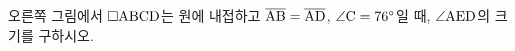 \noindent\begin{minipage}[t]{0.58\linewidth}\vspace{0pt}\raggedright 오른쪽 그림에서 $\square\mathrm{ABCD}$는 원에 내접하고 $\overline{\mathrm{AB}}=\overline{\mathrm{AD}}$, $\angle\mathrm{C}=76^\circ$일 때, $\angle\mathrm{AED}$의 크기를 구하시오.\end{minipage}\hfill\begin{minipage}[t]{0.4\linewidth}\vspace{0pt}\centering \resizebox{\ifdim\width>\linewidth\linewidth\else\width\fi}{!}{}\end{minipage}\par
